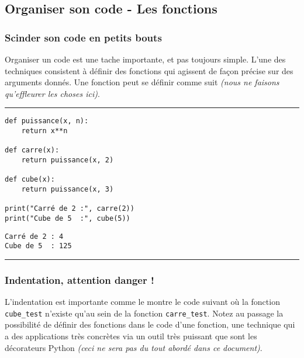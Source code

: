 \subsection{Organiser son code - Les fonctions}

\subsubsection{Scinder son code en petits bouts}

Organiser un code est une tache importante, et pas toujours simple. L'une des techniques consistent à définir des fonctions qui agissent de façon précise sur des arguments donnés. Une fonction peut se définir comme suit \textit{(nous ne faisons qu'effleurer les choses ici)}.


\bigskip
{\hrule height .5mm}
\begin{verbatim}
def puissance(x, n):
    return x**n

def carre(x):
    return puissance(x, 2)

def cube(x):
    return puissance(x, 3)

print("Carré de 2 :", carre(2))
print("Cube de 5  :", cube(5))
\end{verbatim}
 \color{ForestGreen}
\vspace{-1.5em}
\begin{verbatim}
Carré de 2 : 4
Cube de 5  : 125
\end{verbatim} \color{Black}
{\hrule height .5mm}
\bigskip


\subsubsection{Indentation, attention danger !}

L'indentation est importante comme le montre le code suivant où la fonction \texttt{cube\_test} n'existe qu'au sein de la fonction \texttt{carre\_test}. Notez au passage la possibilité de définir des fonctions dans le code d'une fonction, une technique qui a des applications très concrètes via un outil très puissant que sont les décorateurs Python \textit{(ceci ne sera pas du tout abordé dans ce document)}.


